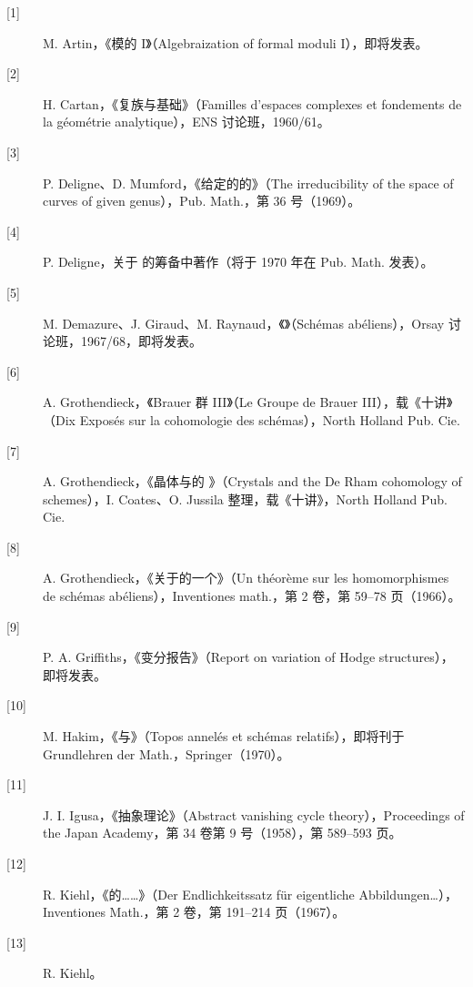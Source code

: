 \begin{description}
\item[{[1]}] M. Artin，《模的 I》（Algebraization of formal moduli I），即将发表。
\item[{[2]}] H. Cartan，《复族与基础》（Familles d'espaces complexes et fondements de la géométrie analytique），ENS 讨论班，1960/61。
\item[{[3]}] P. Deligne、D. Mumford，《给定的的》（The irreducibility of the space of curves of given genus），Pub. Math.，第 36 号（1969）。
\end{description}
\begin{description}
\item[{[4]}] P. Deligne，关于 的筹备中著作（将于 1970 年在 Pub. Math. 发表）。
\item[{[5]}] M. Demazure、J. Giraud、M. Raynaud，《》（Schémas abéliens），Orsay 讨论班，1967/68，即将发表。
\item[{[6]}] A. Grothendieck，《Brauer 群 III》（Le Groupe de Brauer III），载《十讲》（Dix Exposés sur la cohomologie des schémas），North Holland Pub. Cie.
\item[{[7]}] A. Grothendieck，《晶体与的 》（Crystals and the De Rham cohomology of schemes），I. Coates、O. Jussila 整理，载《十讲》，North Holland Pub. Cie.
\item[{[8]}] A. Grothendieck，《关于的一个》（Un théorème sur les homomorphismes de schémas abéliens），Inventiones math.，第 2 卷，第 59--78 页（1966）。
\item[{[9]}] P. A. Griffiths，《变分报告》（Report on variation of Hodge structures），即将发表。
\item[{[10]}] M. Hakim，《与》（Topos annelés et schémas relatifs），即将刊于 Grundlehren der Math.，Springer（1970）。
\item[{[11]}] J. I. Igusa，《抽象理论》（Abstract vanishing cycle theory），Proceedings of the Japan Academy，第 34 卷第 9 号（1958），第 589--593 页。
\item[{[12]}] R. Kiehl，《的……》（Der Endlichkeitssatz für eigentliche Abbildungen\ldots），Inventiones Math.，第 2 卷，第 191--214 页（1967）。
\item[{[13]}] R. Kiehl。
\end{description}
